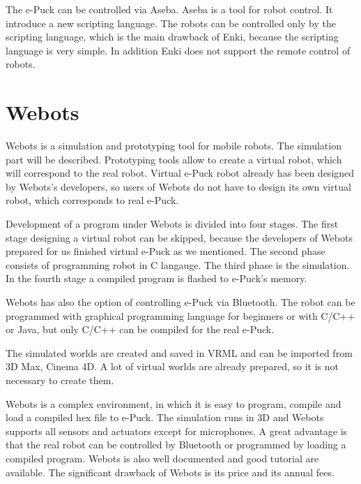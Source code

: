 	The e-Puck can be controlled via Aseba. Aseba is a tool for robot control.
	It introduce a new scripting language. 
	The robots can be controlled only by the scripting language, which is the main
	drawback of Enki, because the scripting language is very simple.
	In addition Enki does not support the remote control of robots.
\section{Webots\cite{webots}}
	
	Webots is a simulation and prototyping tool for mobile robots.
	The simulation part will be described.  Prototyping tools allow to create a virtual robot,
	which will correspond to the real robot.
	Virtual e-Puck robot already has been designed
	by Webots's developers, so users of Webots do not have to design its own virtual robot, 
	which corresponds to real e-Puck.
	
	Development of a program under Webots is divided into four stages. 
	The first stage designing a virtual robot can be skipped,
	because the developers of Webots prepared for us finished virtual e-Puck as we mentioned.
	The second phase consists of programming robot in C langauge. 
	The third phase is the simulation. In the fourth stage a compiled program is flashed to e-Puck's memory.
	
	Webots has also the option of controlling e-Puck via Bluetooth.
	The robot can be programmed with graphical programming language for beginners or with C/C++ or Java,
	but only C/C++ can be compiled for the real e-Puck.
	
	The simulated worlds are created and saved in VRML and can be imported 
	from 3D Max, Cinema 4D.
	A lot of virtual worlds are already prepared, so it is not necessary to create them.
	
	Webots is a complex environment, in which it is easy to program, compile and load 
	a compiled hex file to e-Puck.
	The simulation runs in 3D and Webots supports all sensors and actuators except for microphones.
	A great advantage is that the real robot can be controlled by Bluetooth or
	programmed by loading a compiled program.
	Webots is also well documented and good tutorial are available.
	The significant drawback of Webots is its price and its annual fees.
	

